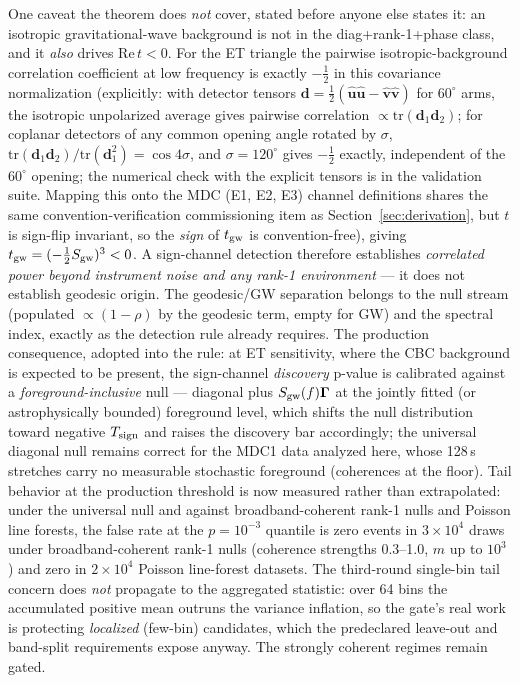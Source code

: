 \documentclass[11pt]{article}
\begin{document}
One caveat the theorem does \emph{not} cover, stated before anyone else states it: an isotropic gravitational-wave background is not in the diag+rank-1+phase class, and it \emph{also} drives $\mathrm{Re}\,t < 0$. For the ET triangle the pairwise iso\-tropic-background correlation coefficient at low frequency is exactly $-\tfrac12$ in this covariance normalization (explicitly: with detector tensors $\mathbf{d} = \tfrac12(\hat{\mathbf{u}}\hat{\mathbf{u}} - \hat{\mathbf{v}}\hat{\mathbf{v}})$ for $60^\circ$ arms, the isotropic unpolarized average gives pairwise correlation $\propto \mathrm{tr}(\mathbf{d}_1\mathbf{d}_2)$; for coplanar detectors of any common opening angle rotated by $\sigma$, $\mathrm{tr}(\mathbf{d}_1\mathbf{d}_2)/\mathrm{tr}(\mathbf{d}_1^2) = \cos 4\sigma$, and $\sigma = 120^\circ$ gives $-\tfrac12$ exactly, independent of the $60^\circ$ opening; the numerical check with the explicit tensors is in the validation suite. Mapping this onto the MDC (E1, E2, E3) channel definitions shares the same convention-verification commissioning item as Section~\ref{sec:derivation}, but $t$ is sign-flip invariant, so the \emph{sign} of $t_{\rm gw}$ is convention-free), giving $t_{\rm gw} = (-\tfrac12 S_{\rm gw})^3 < 0$. A sign-channel detection therefore establishes \emph{correlated power beyond instrument noise and any rank-1 environment} --- it does not establish geodesic origin. The geodesic/GW separation belongs to the null stream (populated $\propto(1-\rho)$ by the geodesic term, empty for GW) and the spectral index, exactly as the detection rule already requires. The production consequence, adopted into the rule: at ET sensitivity, where the CBC background is expected to be present, the sign-channel \emph{discovery} p-value is calibrated against a \emph{foreground-inclusive} null --- diagonal plus $S_{\rm gw}(f)\bm{\Gamma}$ at the jointly fitted (or astrophysically bounded) foreground level, which shifts the null distribution toward negative $T_{\rm sign}$ and raises the discovery bar accordingly; the universal diagonal null remains correct for the MDC1 data analyzed here, whose 128\,s stretches carry no measurable stochastic foreground (coherences at the floor). Tail behavior at the production threshold is now measured rather than extrapolated: under the universal null and against broadband-coherent rank-1 nulls and Poisson line forests, the false rate at the $p = 10^{-3}$ quantile is zero events in $3\times10^4$ draws under broadband-coherent rank-1 nulls (coherence strengths 0.3--1.0, $m$ up to $10^3$) and zero in $2\times10^4$ Poisson line-forest datasets. The third-round single-bin tail concern does \emph{not} propagate to the aggregated statistic: over 64 bins the accumulated positive mean outruns the variance inflation, so the gate's real work is protecting \emph{localized} (few-bin) candidates, which the predeclared leave-out and band-split requirements expose anyway. The strongly coherent regimes remain gated.
\end{document}
